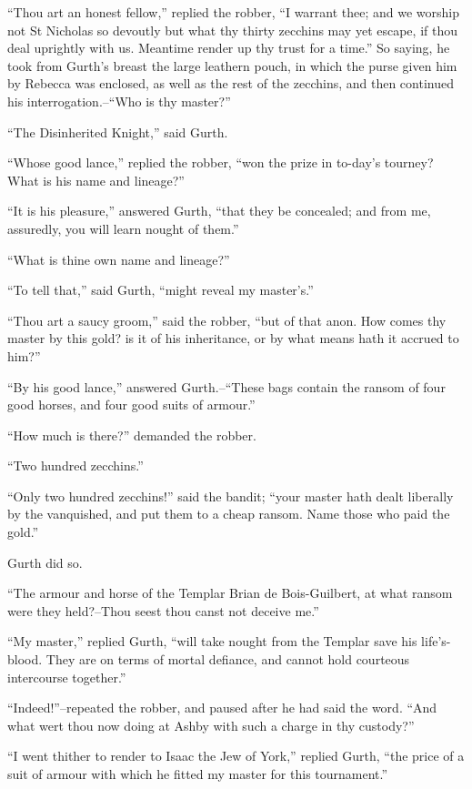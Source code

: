 ``Thou art an honest fellow,'' replied the robber, ``I warrant thee; and
we worship not St Nicholas so devoutly but what thy thirty zecchins may
yet escape, if thou deal uprightly with us. Meantime render up thy trust
for a time.'' So saying, he took from Gurth's breast the large leathern
pouch, in which the purse given him by Rebecca was enclosed, as well as
the rest of the zecchins, and then continued his interrogation.--``Who
is thy master?''

``The Disinherited Knight,'' said Gurth.

``Whose good lance,'' replied the robber, ``won the prize in to-day's
tourney? What is his name and lineage?''

``It is his pleasure,'' answered Gurth, ``that they be concealed; and
from me, assuredly, you will learn nought of them.''

``What is thine own name and lineage?''

``To tell that,'' said Gurth, ``might reveal my master's.''

``Thou art a saucy groom,'' said the robber, ``but of that anon. How
comes thy master by this gold? is it of his inheritance, or by what
means hath it accrued to him?''

``By his good lance,'' answered Gurth.--``These bags contain the ransom
of four good horses, and four good suits of armour.''

``How much is there?'' demanded the robber.

``Two hundred zecchins.''

``Only two hundred zecchins!'' said the bandit; ``your master hath dealt
liberally by the vanquished, and put them to a cheap ransom. Name those
who paid the gold.''

Gurth did so.

``The armour and horse of the Templar Brian de Bois-Guilbert, at what
ransom were they held?--Thou seest thou canst not deceive me.''

``My master,'' replied Gurth, ``will take nought from the Templar save
his life's-blood. They are on terms of mortal defiance, and cannot hold
courteous intercourse together.''

``Indeed!''--repeated the robber, and paused after he had said the word.
``And what wert thou now doing at Ashby with such a charge in thy
custody?''

``I went thither to render to Isaac the Jew of York,'' replied Gurth,
``the price of a suit of armour with which he fitted my master for this
tournament.''

